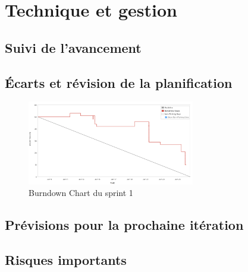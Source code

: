\section{Technique et gestion}
	\subsection{Suivi de l'avancement}
	

	\subsection{Écarts et révision de la planification}
	\begin{figure}[H]
		\centering
		\includegraphics[width=0.65\textwidth]{Figures/burndownChart}
		\caption{Burndown Chart du sprint 1}
		\label{fig.burndowm}
	\end{figure}		

	\subsection{Prévisions pour la prochaine itération}
	

	\subsection{Risques importants}
	
